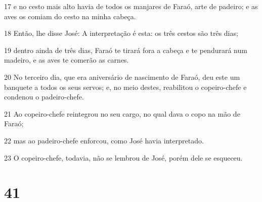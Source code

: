 \par 17 e no cesto mais alto havia de todos os manjares de Faraó, arte de padeiro; e as aves os comiam do cesto na minha cabeça.
\par 18 Então, lhe disse José: A interpretação é esta: os três cestos são três dias;
\par 19 dentro ainda de três dias, Faraó te tirará fora a cabeça e te pendurará num madeiro, e as aves te comerão as carnes.
\par 20 No terceiro dia, que era aniversário de nascimento de Faraó, deu este um banquete a todos os seus servos; e, no meio destes, reabilitou o copeiro-chefe e condenou o padeiro-chefe.
\par 21 Ao copeiro-chefe reintegrou no seu cargo, no qual dava o copo na mão de Faraó;
\par 22 mas ao padeiro-chefe enforcou, como José havia interpretado.
\par 23 O copeiro-chefe, todavia, não se lembrou de José, porém dele se esqueceu.

\chapter{41}

